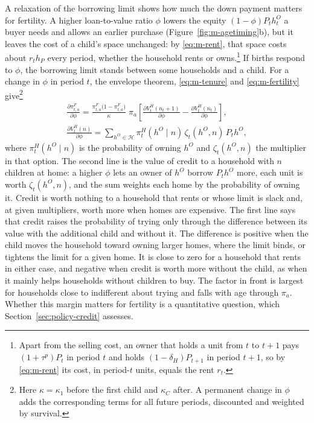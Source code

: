 A relaxation of the borrowing limit shows how much the down payment matters
for fertility. A higher loan-to-value ratio $\phi$ lowers the equity
$(1-\phi)P_th^O_t$ a buyer needs and allows an earlier purchase
(Figure~\ref{fig:m-agetiming}b), but it leaves the cost of a child's space
unchanged: by \eqref{eq:m-rent}, that space costs about $r_th_P$ every
period, whether the household rents or owns.\footnote{Apart from the selling
cost, an owner that holds a unit from $t$ to $t+1$ pays $(1+\tau^p)P_t$ in
period $t$ and holds $(1-\delta_H)P_{t+1}$ in period $t+1$, so by
\eqref{eq:m-rent} its cost, in period-$t$ units, equals the rent $r_t$.} If births respond to $\phi$, the borrowing
limit stands between some households and a child. For a change in $\phi$ in
period $t$, the envelope theorem, \eqref{eq:m-tenure} and
\eqref{eq:m-fertility} give\footnote{Here $\kappa=\kappa_1$ before the first
child and $\kappa_C$ after. A permanent change in $\phi$ adds the
corresponding terms for all future periods, discounted and weighted by
survival.}
\begin{equation}
 \begin{gathered}
 \frac{\partial\pi^F_{t,a}}{\partial\phi}
 =\frac{\pi^F_{t,a}\bigl(1-\pi^F_{t,a}\bigr)}{\kappa}\;\pi_a
 \left[\frac{\partial V^H_t(n_t+1)}{\partial\phi}-\frac{\partial V^H_t(n_t)}{\partial\phi}\right],
 \\
 \frac{\partial V^H_t(n)}{\partial\phi}
 =\sum_{h^O\in\mathcal H}\pi^H_t(h^O\mid n)\,\zeta_t(h^O,n)\,P_th^O ,
 \end{gathered}
 \label{eq:m-credit}
\end{equation}
where $\pi^H_t(h^O\mid n)$ is the probability of owning $h^O$ and
$\zeta_t(h^O,n)$ the multiplier in that option. The second line is the value
of credit to a household with $n$ children at home: a higher $\phi$ lets an
owner of $h^O$ borrow $P_th^O$ more, each unit is worth $\zeta_t(h^O,n)$, and
the sum weights each home by the probability of owning it. Credit is worth
nothing to a household that rents or whose limit is slack and, at given
multipliers, worth more when homes are expensive. The first line says that
credit raises the probability of trying only through the difference between
its value with the additional child and without it. The difference is
positive when the child moves the household toward owning larger homes,
where the limit binds, or tightens the limit for a given home. It is close to
zero for a household that rents in either case, and negative when credit is
worth more without the child, as when it mainly helps households without
children to buy. The factor in front is largest for households close to
indifferent about trying and falls with age through $\pi_a$. Whether this
margin matters for fertility is a quantitative question, which
Section~\ref{sec:policy-credit} assesses.

